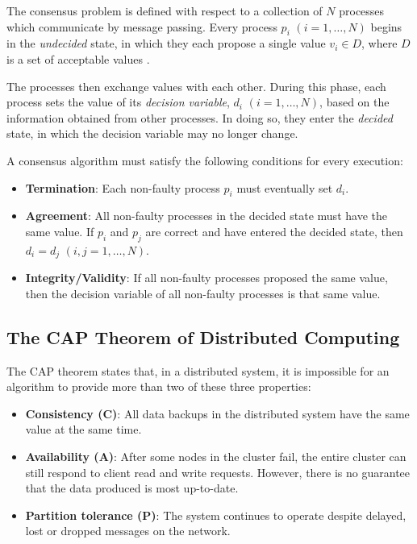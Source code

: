 \documentclass[12pt, a4paper]{article}
\begin{document}
The consensus problem is defined with respect to a collection of $N$ processes
which communicate by message passing. Every process $p_{i}$ $(i = 1, \ldots, N)$
begins in the \textit{undecided} state, in which they each propose a single
value $v_{i} \in D$, where $D$ is a set of acceptable values
\cite{coulouris2005distributed}.

The processes then exchange values with each other. During this phase, each
process sets the value of its \textit{decision variable}, $d_i$ $(i = 1, \ldots,
N)$, based on the information obtained from other processes. In doing so, they
enter the \textit{decided} state, in which the decision variable may no longer
change.

A consensus algorithm must satisfy the following conditions for every execution:

\begin{itemize}
  \item \textbf{Termination}: Each non-faulty process $p_i$ must eventually set
    $d_i$.
  \item \textbf{Agreement}: All non-faulty processes in the decided state
    must have the same value. If $p_{i}$ and $p_{j}$ are correct and have
    entered the decided state, then $d_{i} = d_{j}$ $(i, j = 1, \ldots, N)$.
  \item \textbf{Integrity/Validity}: If all non-faulty processes proposed
    the same value, then the decision variable of all non-faulty processes is
    that same value.
\end{itemize}

\subsection{The CAP Theorem of Distributed Computing} \label{sec:cap-theorem}
The CAP theorem \cite{brewer2012cap} states that, in a distributed system, it is impossible for an algorithm to provide more than two of these three properties:

\begin{itemize}
	\item \textbf{Consistency (C)}: All data backups in the distributed system have
    the same value at the same time.
	\item \textbf{Availability (A)}: After some nodes in the cluster fail, the entire
    cluster can still respond to client read and write requests. However, there
    is no guarantee that the data produced is most up-to-date.
	\item \textbf{Partition tolerance (P)}: The system continues to operate despite
    delayed, lost or dropped messages on the network.
\end{itemize}
\end{document}
